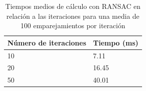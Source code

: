 \begin{table}
\caption{Tiempos medios de cálculo con RANSAC en relación a las iteraciones para una media de 100 emparejamientos por iteración}
\label{tab:ransac-time}
\centering
\begin{tabular}{ l | l }
\toprule
\textbf{Número de iteraciones} & \textbf{Tiempo (ms)}\\
\hline\hline
10 & 7.11\\
\hline
20 & 16.45\\
\hline
50 & 40.01\\
\bottomrule
\end{tabular}
\end{table}